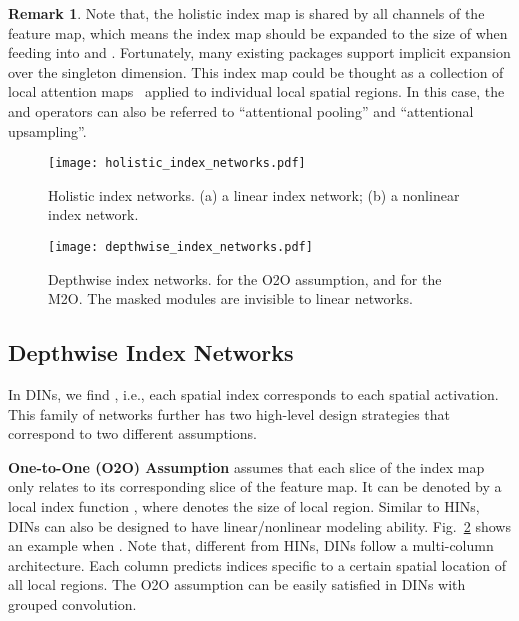 \documentclass[10pt,twocolumn,letterpaper]{article}
\begin{document}
\vspace{5pt}
\noindent\textbf{Remark 1}. Note that, the holistic index map is shared by all channels of the feature map, which means the index map should be expanded to the size of  when feeding into  and . Fortunately, many existing packages support implicit expansion over the singleton dimension. This index map could be thought as a collection of local attention maps~\cite{mnih2014recurrent} applied to individual local spatial regions. In this case, the  and  operators can also be referred to ``attentional pooling'' and ``attentional upsampling''.

\begin{figure}[!tb]
	\captionsetup{font=small,singlelinecheck=true}
	\setlength{\abovecaptionskip}{10pt}
	\centering
	\texttt{[image: holistic\_index\_networks.pdf]}\vspace{-10pt}
	\caption{Holistic index networks. (a) a linear index network; (b) a nonlinear index network.}
	\label{fig:holistic_networks}
\end{figure}

\begin{figure}[!tb]
	\captionsetup{font=small,singlelinecheck=true}
	\setlength{\abovecaptionskip}{10pt}
	\centering
	\texttt{[image: depthwise\_index\_networks.pdf]}\vspace{-8pt}
	\caption{Depthwise index networks.  for the O2O assumption, and  for the M2O. The masked modules are invisible to linear networks.}
	\label{fig:depthwise_networks}
\end{figure}



\subsection{Depthwise Index Networks}\label{subsec:depthwise_networks}

In DINs, we find , i.e., each spatial index corresponds to each spatial activation. This family of networks further has two high-level design strategies that correspond to two different assumptions.

\vspace{3pt}
\noindent\textbf{One-to-One (O2O) Assumption} assumes that each slice of the index map only relates to its corresponding slice of the feature map. It can be denoted by a local index function , where  denotes the size of local region. Similar to HINs, DINs can also be designed to have linear/nonlinear modeling ability. Fig.~\ref{fig:depthwise_networks} shows an example when . Note that, different from HINs, DINs follow a multi-column architecture. Each column predicts indices specific to a certain spatial location of all local regions. The O2O assumption can be easily satisfied in DINs with grouped convolution.
\end{document}
